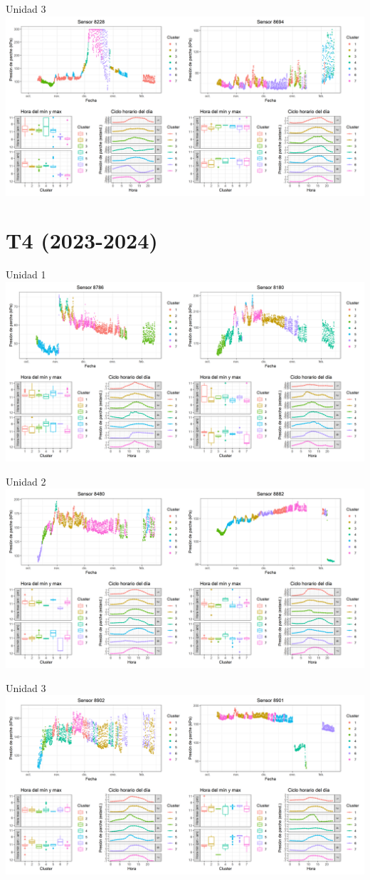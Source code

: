 \documentclass[
  letterpaper,
  DIV=11,
  numbers=noendperiod]{scrreprt}
\begin{document}
Unidad 3
\includegraphics{figuras/01_turgor_sensor/2023_2024_La_Esperanza_T3_Unidad_3.png}

\chapter{T4 (2023-2024)}

Unidad 1
\includegraphics{figuras/01_turgor_sensor/2023_2024_La_Esperanza_T4_Unidad_1.png}

Unidad 2
\includegraphics{figuras/01_turgor_sensor/2023_2024_La_Esperanza_T4_Unidad_2.png}

Unidad 3
\includegraphics{figuras/01_turgor_sensor/2023_2024_La_Esperanza_T4_Unidad_3.png}
\end{document}
